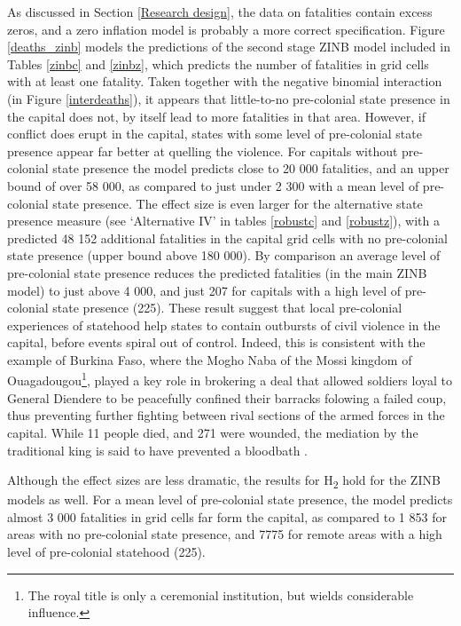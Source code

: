 As discussed in Section \ref{Research design}, the data on fatalities contain
excess zeros, and a zero inflation model is probably a more correct
specification. Figure \ref{deaths_zinb} models the predictions of the second
stage ZINB model included in Tables \ref{zinbc} and \ref{zinbz}, which predicts
the number of fatalities in grid cells with at least one fatality. Taken
together with the negative binomial interaction (in Figure \ref{interdeaths}),
it appears that little-to-no pre-colonial state presence in the capital does
not, by itself lead to more fatalities in that area. However, if conflict does
erupt in the capital, states with some level of pre-colonial state presence
appear far better at quelling the violence. For capitals without pre-colonial
state presence the model predicts close to 20 000 fatalities, and an upper bound
of over 58 000, as compared to just under 2 300 with a mean level of
pre-colonial state presence. The effect size is even larger for the alternative
state presence measure (see `Alternative IV' in tables \ref{robustc} and
\ref{robustz}), with a predicted 48 152 additional fatalities in the capital
grid cells with no pre-colonial state presence (upper bound above 180 000). By
comparison an average level of pre-colonial state presence reduces the predicted
fatalities (in the main ZINB model) to just above 4 000, and just 207 for
capitals with a high level of pre-colonial state presence (225). These result
suggest that local pre-colonial experiences of statehood help states to contain
outbursts of civil violence in the capital, before events spiral out of control.
Indeed, this is consistent with the example of Burkina Faso, where the Mogho
Naba of the Mossi kingdom of Ouagadougou\footnote{The royal title is only a
ceremonial institution, but wields considerable influence.}, played a key role
in brokering a deal that allowed soldiers loyal to General Diendere to be
peacefully confined their barracks folowing a failed coup, thus preventing
further fighting between rival sections of the armed forces in the capital.
While 11 people died, and 271 were wounded, the mediation by the traditional
king is said to have prevented a bloodbath \citep{Reuters2015, BBC2015}.

Although the effect sizes are less dramatic, the results for H\textsubscript{2}
hold for the ZINB models as well. For a mean level of pre-colonial state
presence, the model predicts almost 3 000 fatalities in grid cells far form the
capital, as compared to 1 853 for areas with no pre-colonial state presence, and
7775 for remote areas with a high level of pre-colonial statehood (225).

